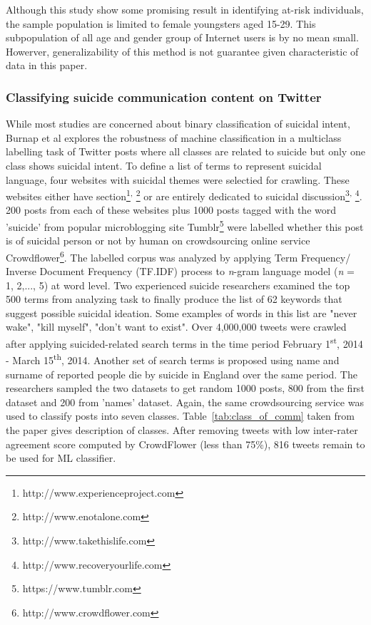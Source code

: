 Although this study show some promising result in identifying at-risk individuals, the sample population is limited to female youngsters aged 15-29. This subpopulation of all age and gender group of Internet users is by no mean small. Howerver, generalizability of this method is not guarantee given characteristic of data in this paper.\\
\subsubsection*{Classifying suicide communication content on Twitter}
While most studies are concerned about binary classification of suicidal intent, Burnap et al \cite{Burnap2015} explores the robustness of machine classification in a multiclass labelling task of Twitter posts where all classes are related to suicide but only one class shows suicidal intent. To define a list of terms to represent suicidal language, four websites with suicidal themes were selectied for crawling. These websites either have section\footnote{http://www.experienceproject.com}\textsuperscript{, }\footnote{http://www.enotalone.com} or are entirely dedicated to suicidal discussion\footnote{http://www.takethislife.com}\textsuperscript{, }\footnote{http://www.recoveryourlife.com}. 200 posts from each of these websites plus 1000 posts tagged with the word 'suicide' from popular microblogging site Tumblr\footnote{https://www.tumblr.com} were labelled whether this post is of suicidal person or not by human on crowdsourcing online service Crowdflower\footnote{http://www.crowdflower.com}. The labelled corpus was analyzed by applying Term Frequency/ Inverse Document Frequency (TF.IDF) process to \textit{n}-gram language model (\textit{n} = 1, 2,..., 5) at word level. Two experienced suicide researchers examined the top 500 terms from analyzing task to finally produce the list of 62 keywords that suggest possible suicidal ideation. Some examples of words in this list are "never wake", "kill myself", "don't want to exist". Over 4,000,000 tweets were crawled after applying suicided-related search terms in the time period  February 1\textsuperscript{st}, 2014 - March 15\textsuperscript{th}, 2014. Another set of search terms is proposed using name and surname of reported people die by suicide in England over the same period. The researchers sampled the two datasets to get random 1000 posts, 800 from the first dataset and 200 from 'names' dataset. Again, the same crowdsourcing service was used to classify posts into seven classes. Table~\ref{tab:class_of_comm} taken from the paper \cite{Burnap2015} gives description of classes. After removing tweets with low inter-rater agreement score computed by CrowdFlower (less than 75\%), 816 tweets remain to be used for ML classifier.
